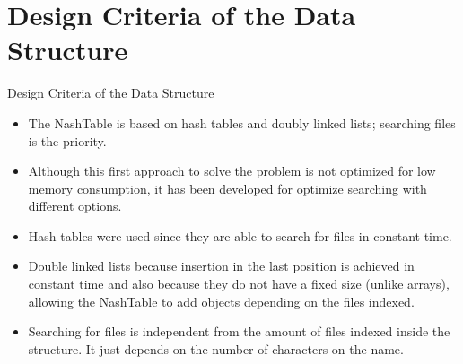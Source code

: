 \section{Design Criteria of the Data Structure}
\begin{frame}{Design Criteria of the Data Structure}
	\begin{itemize}
	\item The NashTable is based on hash tables and doubly linked lists; searching files is the priority.
    \item Although this first approach to solve the problem is not optimized for low memory consumption, it has been developed for optimize searching with different options.
    \item Hash tables were used since they are able to search for files in constant time.
    \item Double linked lists because insertion in the last position is achieved in constant time and also because they do not have a fixed size (unlike arrays), allowing the NashTable to add objects depending on the files indexed.
    \item Searching for files is independent from the amount of files indexed inside the structure. It just depends on the number of characters on the name.
	\end{itemize}
\end{frame}
